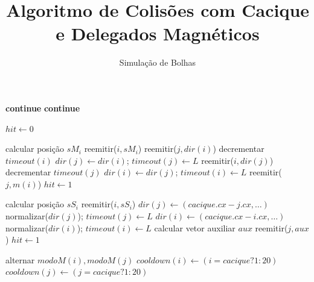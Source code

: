 \documentclass[12pt,a4paper]{article}
\title{Algoritmo de Colisões com Cacique e Delegados Magnéticos}
\author{Simulação de Bolhas}
\date{}
\begin{document}
\maketitle

\begin{algorithm}[H]
\caption{Lógica de colisões entre bolhas}
\begin{algorithmic}[1]
\small %

      \State \textbf{continue}
    \EndIf
      \State \textbf{continue}
    \EndIf

    \State $hit \gets 0$

        \State calcular posição $sM_i$
          \State reemitir($i, sM_i$)
            \State reemitir($j, dir(i)$)
            \State decrementar $timeout(i)$
              \State $dir(j) \gets dir(i)$; $timeout(j) \gets L$
            \EndIf
            \State reemitir($i, dir(j)$)
            \State decrementar $timeout(j)$
              \State $dir(i) \gets dir(j)$; $timeout(i) \gets L$
            \EndIf
          \Else
            \State reemitir($j, m(i)$)
          \EndIf
          \State $hit \gets 1$
        \EndIf
      \EndIf
    \EndIf

        \State calcular posição $sS_i$
          \State reemitir($i, sS_i$)
            \State $dir(j) \gets (cacique.cx - j.cx, \ldots)$
            \State normalizar($dir(j)$); $timeout(j) \gets L$
            \State $dir(i) \gets (cacique.cx - i.cx, \ldots)$
            \State normalizar($dir(i)$); $timeout(i) \gets L$
          \Else
            \State calcular vetor auxiliar $aux$
            \State reemitir($j, aux$)
          \EndIf
          \State $hit \gets 1$
        \EndIf
      \EndIf
    \EndIf

      \State alternar $modoM(i), modoM(j)$
      \State $cooldown(i) \gets (i = cacique ? 1 : 20)$
      \State $cooldown(j) \gets (j = cacique ? 1 : 20)$
    \EndIf

  \EndFor
\EndFor
\end{algorithmic}
\end{algorithm}
\end{document}
